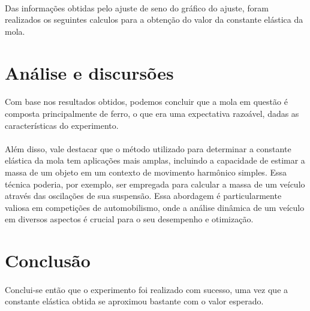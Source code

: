 \documentclass[a4paper, 12pt]{article}
\begin{document}
\paragraph{} Das informações obtidas pelo ajuste de seno do gráfico do ajuste, foram
realizados os seguintes calculos para a obtenção do valor da constante elástica
da mola.

\newpage
\pagebreak
{}

\section{Análise e discursões}

\paragraph{} Com base nos resultados obtidos, podemos concluir que a mola em questão é
composta principalmente de ferro, o que era uma expectativa razoável, dadas as
características do experimento.

\paragraph{} Além disso, vale destacar que o método utilizado para determinar a constante
elástica da mola tem aplicações mais amplas, incluindo a capacidade de estimar
a massa de um objeto em um contexto de movimento harmônico simples. Essa
técnica poderia, por exemplo, ser empregada para calcular a massa de um veículo
através das oscilações de sua suspensão. Essa abordagem é particularmente
valiosa em competições de automobilismo, onde a análise dinâmica de um veículo
em diversos aspectos é crucial para o seu desempenho e otimização.

\section{Conclusão}
\paragraph{} Conclui-se então que o experimento foi realizado com sucesso, uma vez que a
constante elástica obtida se aproximou bastante com o valor esperado.

\end{document}
